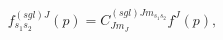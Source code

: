 \begin{equation}
f_{s_{1}s_{2}}^{\left( sgl\right) J}(p)=C_{Jm_{J}}^{\left( sgl\right)
Jm_{s_{1}s_{2}}}f^{J}(p),
\end{equation}


